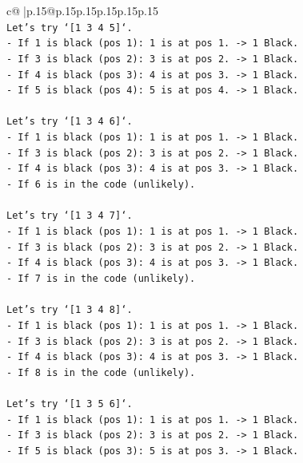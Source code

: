 \documentclass{article}
\begin{document}
{\begin{supertabular}{c@{$\;$}|p{.15\linewidth}@{}p{.15\linewidth}p{.15\linewidth}p{.15\linewidth}p{.15\linewidth}p{.15\linewidth}}
{{{\\ 
\texttt{Let's try `{[}1 3 4 5{]}`.} \\
\texttt{{-} If 1 is black (pos 1): 1 is at pos 1. {-}> 1 Black.} \\
\texttt{{-} If 3 is black (pos 2): 3 is at pos 2. {-}> 1 Black.} \\
\texttt{{-} If 4 is black (pos 3): 4 is at pos 3. {-}> 1 Black.} \\
\texttt{{-} If 5 is black (pos 4): 5 is at pos 4. {-}> 1 Black.} \\
\\ 
\texttt{Let's try `{[}1 3 4 6{]}`.} \\
\texttt{{-} If 1 is black (pos 1): 1 is at pos 1. {-}> 1 Black.} \\
\texttt{{-} If 3 is black (pos 2): 3 is at pos 2. {-}> 1 Black.} \\
\texttt{{-} If 4 is black (pos 3): 4 is at pos 3. {-}> 1 Black.} \\
\texttt{{-} If 6 is in the code (unlikely).} \\
\\ 
\texttt{Let's try `{[}1 3 4 7{]}`.} \\
\texttt{{-} If 1 is black (pos 1): 1 is at pos 1. {-}> 1 Black.} \\
\texttt{{-} If 3 is black (pos 2): 3 is at pos 2. {-}> 1 Black.} \\
\texttt{{-} If 4 is black (pos 3): 4 is at pos 3. {-}> 1 Black.} \\
\texttt{{-} If 7 is in the code (unlikely).} \\
\\ 
\texttt{Let's try `{[}1 3 4 8{]}`.} \\
\texttt{{-} If 1 is black (pos 1): 1 is at pos 1. {-}> 1 Black.} \\
\texttt{{-} If 3 is black (pos 2): 3 is at pos 2. {-}> 1 Black.} \\
\texttt{{-} If 4 is black (pos 3): 4 is at pos 3. {-}> 1 Black.} \\
\texttt{{-} If 8 is in the code (unlikely).} \\
\\ 
\texttt{Let's try `{[}1 3 5 6{]}`.} \\
\texttt{{-} If 1 is black (pos 1): 1 is at pos 1. {-}> 1 Black.} \\
\texttt{{-} If 3 is black (pos 2): 3 is at pos 2. {-}> 1 Black.} \\
\texttt{{-} If 5 is black (pos 3): 5 is at pos 3. {-}> 1 Black.} \\
}}}
\end{supertabular}}
\end{document}
